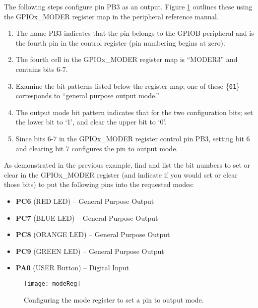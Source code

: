 \documentclass[openany,11pt,fleqn]{book} %
\begin{document}
\begin{example}
    The following steps configure pin PB3 as an output. Figure \ref{modeReg} outlines these using the GPIOx\_MODER register map in the peripheral reference manual.
    \begin{enumerate}
        \item The name PB3 indicates that the pin belongs to the GPIOB peripheral and is the fourth pin in the control register (pin numbering begins at zero).
        \item The fourth cell in the GPIOx\_MODER register map is ``MODER3'' and contains bits 6-7.
        \item Examine the bit patterns listed below the register map; one of these \{\texttt{01}\} corresponds to ``general purpose output mode.''
        \item The output mode bit pattern indicates that for the two configuration bits; set the lower bit to `1', and clear the upper bit to `0'.
        \item Since bits 6-7 in the GPIOx\_MODER register control pin PB3, setting bit 6 and clearing bit 7 configures the pin to output mode. 
    \end{enumerate}  
\end{example}

\begin{exercise}
    
    As demonstrated in the previous example, find and list the bit numbers to set or clear in the GPIOx\_MODER register (and indicate if you would set or clear those bits) to put the following pins into the requested modes:
    
    \begin{itemize}
        \item \textbf{PC6} (RED LED) -- General Purpose Output 
        \item \textbf{PC7} (BLUE LED) -- General Purpose Output 
        \item \textbf{PC8} (ORANGE LED) -- General Purpose Output 
        \item \textbf{PC9} (GREEN LED) -- General Purpose Output 
        \item \textbf{PA0} (USER Button) -- Digital Input  
    \end{itemize}
\end{exercise}

\begin{figure}[]
    \centering\texttt{[image: modeReg]}
    \caption{Configuring the mode register to set a pin to output mode.}
    \label{modeReg}
\end{figure}
\end{document}
